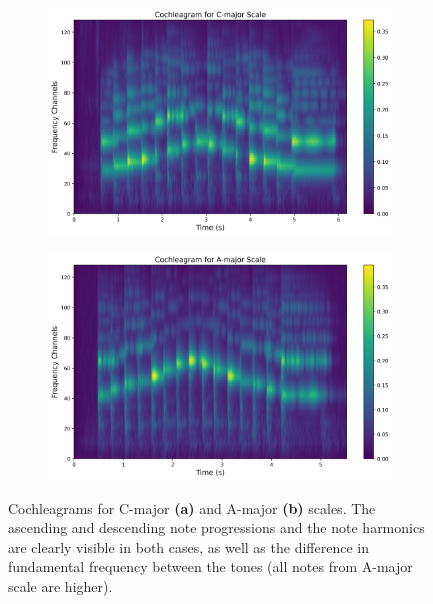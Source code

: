 \begin{figure}[t]
	\centering
	\begin{subfigure}{0.5\textwidth}
		\centering
		\includegraphics[width=\linewidth]{include/cochleagram_example_C-major}
		\caption{}
		\label{img:cochleagram_example_C-major}
	\end{subfigure}%
	\begin{subfigure}{0.5\textwidth}
		\centering
		\includegraphics[width=\linewidth]{include/cochleagram_example_A-major}
		\caption{}
		\label{img:cochleagram_example_A-major}
	\end{subfigure}
	\caption[Comparison of cochleagrams for C-major and A-major scales]{Cochleagrams for C-major \textbf{(a)} and A-major \textbf{(b)} scales. The ascending and descending note progressions and the note harmonics are clearly visible in both cases, as well as the difference in fundamental frequency between the tones (all notes from A-major scale are higher).}
	\label{img:cochleagram_example}
\end{figure}

